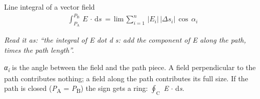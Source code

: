 \documentclass[11pt]{article}
\begin{document}
\begin{keepsection}
\begin{equationcard}{Line integral of a vector field}
\[ \begin{gathered} \int_{{P}_{\mathrm{A}}}^{{P}_{\mathrm{B}}} \, {E}\, \cdot \, \mathrm{d}{s}\, =\, \text{lim}\, \sum_{{i}=1}^{{n}} \, |{E}_{{i}}|\, |Δ{s}_{{i}}|\, \cos \, {α}_{{i}} \end{gathered} \]
{\small \emph{Read it as: “the integral of E dot d s: add the component of E along the path, times the path length”.}\par \textit{α}\textsubscript{\textit{i}} is the angle between the field and the path piece. A field perpendicular to the path contributes nothing; a field along the path contributes its full size. If the path is closed (\textit{P}\textsubscript{A} = \textit{P}\textsubscript{B}) the sign gets a ring: $\oint_{\mathrm{C}} $ \textit{E} \ensuremath{\cdot} d\textit{s}.}
\end{equationcard}


\end{keepsection}
\end{document}
